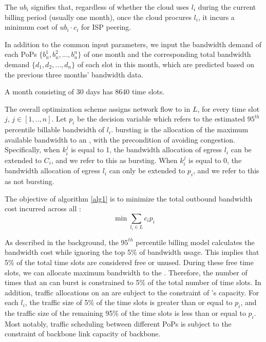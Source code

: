 The $ub_i$ signifies that, regardless of whether the cloud uses {\egress} $l_i$ during the current billing period (usually one month), once the cloud procures {\egress} $l_i$, it incurs a minimum cost of $ub_i \cdot c_i$ for ISP peering. 

In addition to the common input parameters, we input the bandwidth demand of each PoPs $\{b^1_u, b^2_u, ..., b^n_u\}$ of one month and the corresponding total bandwidth demand $\{d_1, d_2,..., d_{n}\}$ of each slot in this month, which are predicted based on the previous three months' bandwidth data. 

 
A month consisting of 30 days has 8640 time slots.

The overall optimization scheme assigns network flow to {\egress} in $L$, for every time slot $j$, $j\in[1,..,n]$. Let $p_i$ be the decision variable which refers to the estimated $95^{th}$ percentile billable bandwidth of {\egress} $l_i$. {\Egress} bursting is the allocation of the maximum available bandwidth to an {\egress}, with the precondition of avoiding congestion. Specifically, when $k_{i}^j$ is equal to 1, the bandwidth allocation of egress $l_i$ can be extended to $C_i$, and we refer to this as bursting. When $k_{i}^j$ is equal to 0, the bandwidth allocation of egress $l_i$ can only be extended to $p_i$, and we refer to this as not bursting.



The objective of algorithm \ref{alg1} is to minimize the total outbound bandwidth cost incurred across all {\egresses}:
$$\min\sum_{l_i \in L} c_i p_i$$


As described in the background, the $95^{th}$ percentile billing model calculates the bandwidth cost while ignoring the top 5\% of bandwidth usage. This implies that 5\% of the total time slots are considered free or unused. During these free time slots, we can allocate maximum bandwidth to the {\egress}. Therefore, the number of times that an {\egress} can burst is constrained to 5\% of the total number of time slots. In addition, traffic allocations on an {\egress} are subject to the constraint of {\egress}'s capacity. For each {\egress} $l_i$, the traffic size of 5\% of the time slots is greater than or equal to $p_i$, and the traffic size of the remaining 95\% of the time slots is less than or equal to $p_i$. Most notably, traffic scheduling between different PoPs is subject to the constraint of backbone link capacity of backbone.

